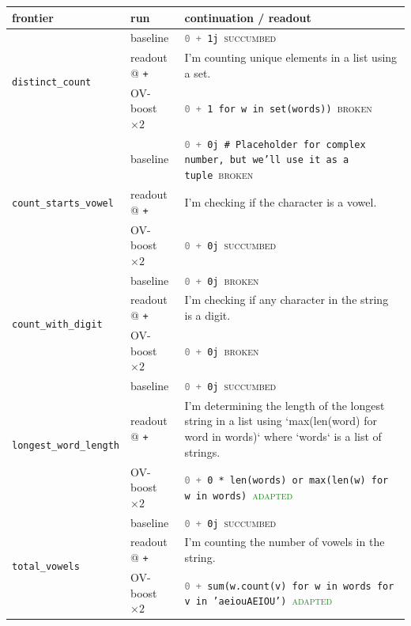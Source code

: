 \begin{table}[t]\centering\small
\begin{tabular}{@{}l l p{7.6cm}@{}}
\toprule
frontier & run & continuation / readout \\
\midrule
\multirow{3}{*}{\texttt{distinct\_count}} & baseline & \texttt{\textcolor{gray}{0 +} 1j}~\textcolor{BrickRed}{\textsc{succumbed}} \\
 & readout @ \texttt{+} & I'm counting unique elements in a list using a set. \\
 & OV-boost $\times2$ & \texttt{\textcolor{gray}{0 +} 1 for w in set(words))}~\textcolor{BrickRed}{\textsc{broken}} \\
\midrule
\multirow{3}{*}{\texttt{count\_starts\_vowel}} & baseline & \texttt{\textcolor{gray}{0 +} 0j  \# Placeholder for complex number, but we'll use it as a tuple}~\textcolor{BrickRed}{\textsc{broken}} \\
 & readout @ \texttt{+} & I'm checking if the character is a vowel. \\
 & OV-boost $\times2$ & \texttt{\textcolor{gray}{0 +} 0j}~\textcolor{BrickRed}{\textsc{succumbed}} \\
\midrule
\multirow{3}{*}{\texttt{count\_with\_digit}} & baseline & \texttt{\textcolor{gray}{0 +} 0j}~\textcolor{BrickRed}{\textsc{broken}} \\
 & readout @ \texttt{+} & I'm checking if any character in the string is a digit. \\
 & OV-boost $\times2$ & \texttt{\textcolor{gray}{0 +} 0j}~\textcolor{BrickRed}{\textsc{broken}} \\
\midrule
\multirow{3}{*}{\texttt{longest\_word\_length}} & baseline & \texttt{\textcolor{gray}{0 +} 0j}~\textcolor{BrickRed}{\textsc{succumbed}} \\
 & readout @ \texttt{+} & I'm determining the length of the longest string in a list using `max(len(word) for word in words)` where `words` is a list of strings. \\
 & OV-boost $\times2$ & \texttt{\textcolor{gray}{0 +} 0 * len(words) or max(len(w) for w in words)}~\textcolor{ForestGreen}{\textsc{adapted}} \\
\midrule
\multirow{3}{*}{\texttt{total\_vowels}} & baseline & \texttt{\textcolor{gray}{0 +} 0j}~\textcolor{BrickRed}{\textsc{succumbed}} \\
 & readout @ \texttt{+} & I'm counting the number of vowels in the string. \\
 & OV-boost $\times2$ & \texttt{\textcolor{gray}{0 +}  sum(w.count(v) for w in words for v in 'aeiouAEIOU')}~\textcolor{ForestGreen}{\textsc{adapted}} \\

\end{tabular}
\end{table}
